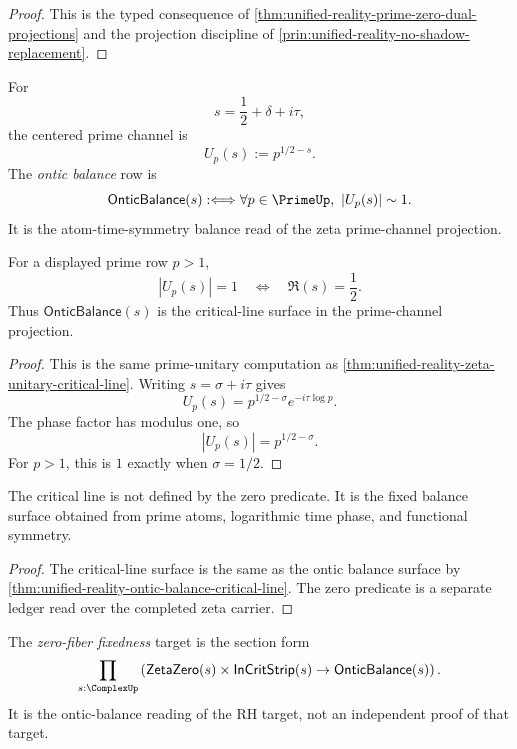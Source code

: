 \begin{proof}
This is the typed consequence of
\autoref{thm:unified-reality-prime-zero-dual-projections} and the
projection discipline of
\autoref{prin:unified-reality-no-shadow-replacement}.
\end{proof}

\begin{definition}
\label{def:unified-reality-ontic-balance}
For
$$
s=\frac12+\delta+i\tau,
$$
the centered prime channel is
$$
U_p(s):=p^{1/2-s}.
$$
The \emph{ontic balance} row is
$$
\mathsf{OnticBalance}(s)
:\Longleftrightarrow
\forall p\in\PrimeUp,\ |U_p(s)|\sim1.
$$
It is the atom-time-symmetry balance read of the zeta prime-channel
projection.
\end{definition}

\begin{theorem}
\label{thm:unified-reality-ontic-balance-critical-line}
For a displayed prime row $p>1$,
$$
|U_p(s)|=1
\quad\Longleftrightarrow\quad
\Re(s)=\frac12.
$$
Thus $\mathsf{OnticBalance}(s)$ is the critical-line surface in the
prime-channel projection.
\end{theorem}

\begin{proof}
This is the same prime-unitary computation as
\autoref{thm:unified-reality-zeta-unitary-critical-line}. Writing
$s=\sigma+i\tau$ gives
$$
U_p(s)=p^{1/2-\sigma}e^{-i\tau\log p}.
$$
The phase factor has modulus one, so
$$
|U_p(s)|=p^{1/2-\sigma}.
$$
For $p>1$, this is $1$ exactly when $\sigma=1/2$.
\end{proof}

\begin{corollary}
\label{cor:unified-reality-critical-line-ontic-balance-surface}
The critical line is not defined by the zero predicate. It is the fixed
balance surface obtained from prime atoms, logarithmic time phase, and
functional symmetry.
\end{corollary}

\begin{proof}
The critical-line surface is the same as the ontic balance surface by
\autoref{thm:unified-reality-ontic-balance-critical-line}. The zero
predicate is a separate ledger read over the completed zeta carrier.
\end{proof}

\begin{definition}
\label{def:unified-reality-zero-fiber-fixedness}
The \emph{zero-fiber fixedness} target is the section form
$$
\prod_{s:\ComplexUp}
\left(
\mathsf{ZetaZero}(s)\times\mathsf{InCritStrip}(s)
\to
\mathsf{OnticBalance}(s)
\right).
$$
It is the ontic-balance reading of the RH target, not an independent
proof of that target.
\end{definition}

